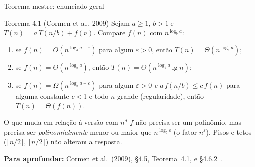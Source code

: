 \documentclass[aspectratio=169,xcolor=table]{beamer}
\newcommand{\fonte}[1]{%
  \vfill
  {\tiny\color{gray!55!black}\textbf{Para aprofundar:} #1\par}%
}
\begin{document}
\begin{frame}{Teorema mestre: enunciado geral}
  \begin{block}{Teorema 4.1 (Cormen et al., 2009)}
    \scriptsize Sejam $a\ge 1$, $b>1$ e $T(n)=a\,T(n/b)+f(n)$. Compare $f(n)$ com $n^{\log_b a}$:
    \begin{enumerate}\scriptsize
      \item se $f(n)=O(n^{\log_b a-\varepsilon})$ para algum $\varepsilon>0$, então $T(n)=\Theta(n^{\log_b a})$;
      \item se $f(n)=\Theta(n^{\log_b a})$, então $T(n)=\Theta(n^{\log_b a}\lg n)$;
      \item se $f(n)=\Omega(n^{\log_b a+\varepsilon})$ para algum $\varepsilon>0$ \emph{e}
            $a\,f(n/b)\le c\,f(n)$ para alguma constante $c<1$ e todo $n$ grande
            (regularidade), então $T(n)=\Theta(f(n))$.
    \end{enumerate}
  \end{block}
  \begin{exampleblock}{O que muda em relação à versão com $n^d$}
    \scriptsize $f$ não precisa ser um polinômio, mas precisa ser
    \emph{polinomialmente} menor ou maior que $n^{\log_b a}$ (o fator $n^\varepsilon$).
    Pisos e tetos ($\lfloor n/2\rfloor$, $\lceil n/2\rceil$) não alteram a resposta.
  \end{exampleblock}
  \fonte{Cormen et al.\ (2009), \S 4.5, Teorema~4.1, e \S 4.6.2~\cite{cormen2009introduction}.}
\end{frame}
\end{document}
